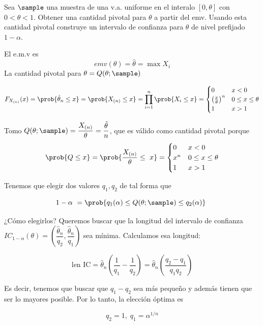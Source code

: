 \begin{problem}[6]
Sea $\sample$ una muestra de una v.a. uniforme en el interalo $[0,\theta]$ con $0 < \theta < 1$. Obtener una cantidad pivotal para $\theta$ a partir del emv. Usando esta cantidad pivotal construye un intervalo de confianza para $\theta$ de nivel prefijado $1-\alpha$.

\solution

El e.m.v es \[ emv (\theta) = \hat{\theta} = \max X_i \] La cantidad pivotal para $\theta = Q(\theta; \sample)$

\[ F_{X_{(n)}} (x) = \prob{\hat{\theta}_n \leq x} = \prob{X_{(n)} \leq x} = \prod_{i=1}^{n} \prob{X_i \leq x} = \begin{cases}
0& x<0 \\
\left( \frac{x}{\theta} \right)^n & 0\leq x \leq \theta \\
1 & x > 1
\end{cases}\]

Tomo $Q(\theta; \sample ) = \dfrac{X_{(n)}}{\theta} = \dfrac{\hat{\theta}}{n}$, que es válido como cantidad pivotal porque \[ \prob{Q \leq x} = \prob{\frac{X_{(n)}}{\theta} \leq x} = \begin{cases}
0 & x<0 \\
x^n & 0\leq x \leq \theta \\
1 & x > 1
\end{cases} \]

Tenemos que elegir dos valores $q_1, q_2$ de tal forma que 

\[ 1- \alpha = \prob{q_1(\alpha) \leq Q(\theta;\sample) \leq q_2(\alpha)} \]

¿Cómo elegirlos? Queremos buscar que la longitud del intervalo de confianza $IC_{1-\alpha}(\theta) = \left(\dfrac{\hat{\theta}_n}{q_2},\dfrac{\hat{\theta}_n}{q_1}\right)$ sea mínima. Calculamos esa longitud:

\[ \text{len IC} = \hat{\theta}_n\left(\frac{1}{q_1}-\frac{1}{q_2}\right)=\hat{\theta}_n \left(\frac{q_2-q_1}{q_1q_2}\right) \]

Es decir, tenemos que buscar que $q_1-q_2$ sea más pequeño y además tienen que ser lo mayores posible. Por lo tanto, la elección óptima es 

\[ q_2 = 1,\;q_1=\alpha^{1/n} \]

\end{problem}

